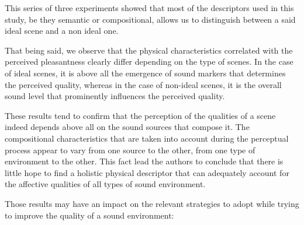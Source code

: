 \documentclass[twoside,twocolumn]{article}
\begin{document}
This series of three experiments showed that most of the descriptors used in this study, be they semantic or compositional, allows us to distinguish between a said ideal scene and a non ideal one.


That being said, we observe that the physical characteristics correlated with the perceived pleasantness clearly differ depending on the type of scenes. In the case of ideal scenes, it is above all the emergence of sound markers that determines the perceived quality, whereas in the case of non-ideal scenes, it is the overall sound level that prominently influences the perceived quality.


These results tend to confirm that the perception of the qualities of a scene indeed depends above all on the sound sources that compose it. The compositional characteristics that are taken into account during the perceptual process appear to vary from one source to the other, from one type of environment to the other. This fact lead the authors to conclude that there is little hope to find a holistic physical descriptor that can adequately account for the affective qualities of all types of sound environment.


Those results may have an impact on the relevant strategies to adopt while trying to improve the quality of a sound environment:

\end{document}

